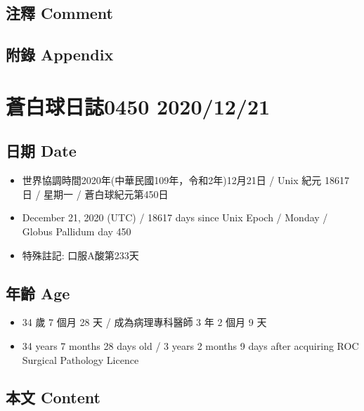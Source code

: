 \documentclass[a5paper, 10pt
]{book}
\providecommand{\tightlist}{%
  \setlength{\itemsep}{0pt}\setlength{\parskip}{0pt}}
\begin{document}
\hypertarget{ux6ce8ux91cb-comment-19}{%
\subsection{注釋 Comment}\label{ux6ce8ux91cb-comment-19}}

\hypertarget{ux9644ux9304-appendix-19}{%
\subsection{附錄 Appendix}\label{ux9644ux9304-appendix-19}}

\hypertarget{ux84bcux767dux7403ux65e5ux8a8c0450-20201221}{%
\section{蒼白球日誌0450
2020/12/21}\label{ux84bcux767dux7403ux65e5ux8a8c0450-20201221}}

\hypertarget{ux65e5ux671f-date-20}{%
\subsection{日期 Date}\label{ux65e5ux671f-date-20}}

\begin{itemize}
\tightlist
\item
  世界協調時間2020年(中華民國109年，令和2年)12月21日 / Unix 紀元 18617
  日 / 星期一 / 蒼白球紀元第450日
\item
  December 21, 2020 (UTC) / 18617 days since Unix Epoch / Monday /
  Globus Pallidum day 450
\item
  特殊註記: 口服A酸第233天
\end{itemize}

\hypertarget{ux5e74ux9f61-age-20}{%
\subsection{年齡 Age}\label{ux5e74ux9f61-age-20}}

\begin{itemize}
\tightlist
\item
  34 歲 7 個月 28 天 / 成為病理專科醫師 3 年 2 個月 9 天
\item
  34 years 7 months 28 days old / 3 years 2 months 9 days after
  acquiring ROC Surgical Pathology Licence
\end{itemize}

\hypertarget{ux672cux6587-content-20}{%
\subsection{本文 Content}\label{ux672cux6587-content-20}}
\end{document}
